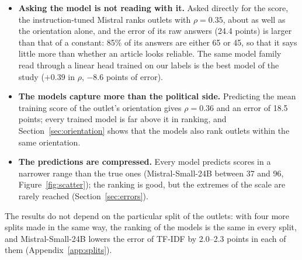 \documentclass[11pt,a4paper]{article}
\begin{document}
\begin{itemize}
        We fine-tuned ModernBERT with fixed hyper-parameters and one seed, so this concerns this small encoder, not
        fine-tuning in general.
  \item \textbf{Asking the model is not reading with it.} Asked directly for the score, the instruction-tuned Mistral
        ranks outlets with $\rho = 0.35$, about as well as the orientation alone, and the error of its raw answers (24.4 points) is larger than that of a constant: 85\% of its answers are either 65 or 45, so that it says little more than
        whether an article looks reliable. The same model family read through a linear head trained on our labels is
        the best model of the study ($+0.39$ in $\rho$, $-8.6$ points of error).
  \item \textbf{The models capture more than the political side.} Predicting the mean training score of the outlet's
        orientation gives $\rho = 0.36$ and an error of 18.5 points; every trained model is far above it in ranking, and
        Section~\ref{sec:orientation} shows that the models also rank outlets within the same orientation.
  \item \textbf{The predictions are compressed.} Every model predicts scores in a narrower range than the true ones
        (Mistral-Small-24B between 37 and 96, Figure~\ref{fig:scatter}); the ranking is good, but the extremes of the
        scale are rarely reached (Section~\ref{sec:errors}).
\end{itemize}
The results do not depend on the particular split of the outlets: with four more splits made in the same way, the
ranking of the models is the same in every split, and Mistral-Small-24B lowers the error of TF-IDF by 2.0--2.3
points in each of them (Appendix~\ref{app:splits}).
\end{document}
